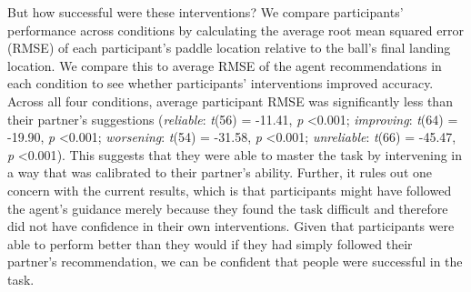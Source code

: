 \documentclass[10pt,letterpaper]{article}
\begin{document}
But how successful were these interventions? We compare participants' performance across conditions by calculating the average root mean squared error (RMSE) of each participant's paddle location relative to the ball's final landing location. We compare this to average RMSE of the agent recommendations in each condition to see whether participants' interventions improved accuracy. Across all four conditions, average participant RMSE was significantly less than their partner's suggestions (\textit{reliable}: \textit{t}(56) = -11.41, \textit{p} \textless{0.001}; \textit{improving}: \textit{t}(64) = -19.90, \textit{p} \textless{0.001}; \textit{worsening}: \textit{t}(54) = -31.58, \textit{p} \textless{0.001}; \textit{unreliable}: \textit{t}(66) = -45.47, \textit{p} \textless{0.001}). This suggests that they were able to master the task by intervening in a way that was calibrated to their partner's ability. Further, it rules out one concern with the current results, which is that participants might have followed the agent's guidance merely because they found the task difficult and therefore did not have confidence in their own interventions. Given that participants were able to perform better than they would if they had simply followed their partner's recommendation, we can be confident that people were successful in the task.




\end{document}
